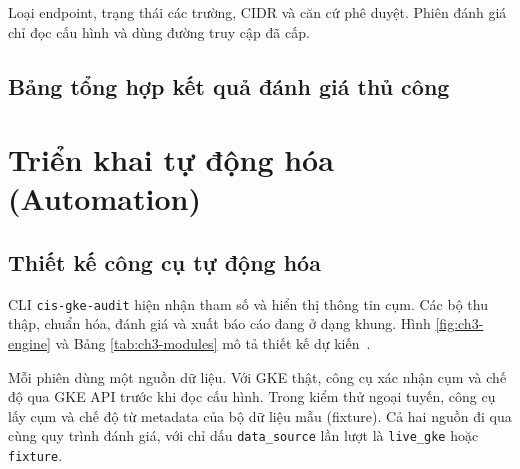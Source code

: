 Loại endpoint, trạng thái các trường, CIDR và căn cứ phê duyệt. Phiên đánh giá chỉ đọc cấu hình và dùng đường truy cập đã cấp.


\subsection{Bảng tổng hợp kết quả đánh giá thủ công}

{\small{}}


\section{Triển khai tự động hóa (Automation)}

\subsection{Thiết kế công cụ tự động hóa}

CLI \texttt{cis-gke-audit} hiện nhận tham số và hiển thị thông tin cụm. Các bộ thu thập, chuẩn hóa, đánh giá và xuất báo cáo đang ở dạng khung. Hình \ref{fig:ch3-engine} và Bảng \ref{tab:ch3-modules} mô tả thiết kế dự kiến~\mbox{\parencites{project-overview}{project-collaboration}}.


Mỗi phiên dùng một nguồn dữ liệu. Với GKE thật, công cụ xác nhận cụm và chế độ qua GKE API trước khi đọc cấu hình. Trong kiểm thử ngoại tuyến, công cụ lấy cụm và chế độ từ metadata của bộ dữ liệu mẫu (fixture). Cả hai nguồn đi qua cùng quy trình đánh giá, với chỉ dấu \texttt{data\_source} lần lượt là \texttt{live\_gke} hoặc \texttt{fixture}.

